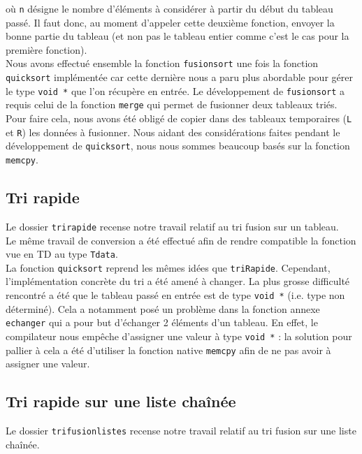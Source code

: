 \documentclass[11pt]{article}
\begin{document}
où \texttt{n} désigne le nombre d'éléments à considérer à partir du début du tableau passé. Il faut donc, au moment d'appeler cette deuxième fonction, envoyer la bonne partie du tableau (et non pas le tableau entier comme c'est le cas pour la première fonction). \\

Nous avons effectué ensemble la fonction \texttt{fusionsort} une fois la fonction \texttt{quicksort} implémentée car cette dernière nous a paru plus abordable pour gérer le type \texttt{void *} que l'on récupère en entrée.
Le développement de \texttt{fusionsort} a requis celui de la fonction \texttt{merge} qui permet de fusionner deux tableaux triés. Pour faire cela, nous avons été obligé de copier dans des tableaux temporaires (\texttt{L} et \texttt{R}) les données à fusionner. Nous aidant des considérations faites pendant le développement de \texttt{quicksort}, nous nous sommes beaucoup basés sur la fonction \texttt{memcpy}.

\subsection{Tri rapide}

\quad \quad Le dossier \texttt{tri\textunderscore rapide} recense notre travail relatif au tri fusion sur un tableau. \\

Le même travail de conversion a été effectué afin de rendre compatible la fonction vue en TD au type \texttt{T\textunderscore data}. \\

La fonction \texttt{quicksort} reprend les mêmes idées que \texttt{triRapide}. Cependant, l'implémentation concrète du tri a été amené à changer. La plus grosse difficulté rencontré a été que le tableau passé en entrée est de type \texttt{void *} (i.e. type non déterminé).
Cela a notamment posé un problème dans la fonction annexe \texttt{echanger} qui a pour but d'échanger 2 éléments d'un tableau. En effet, le compilateur nous empêche d'assigner une valeur à type \texttt{void *} : la solution pour pallier à cela a été d'utiliser la fonction native \texttt{memcpy} afin de ne pas avoir à assigner une valeur. 

\subsection{Tri rapide sur une liste chaînée}

\quad \quad Le dossier \texttt{tri\textunderscore fusion\textunderscore listes} recense notre travail relatif au tri fusion sur une liste chaînée.
\end{document}
